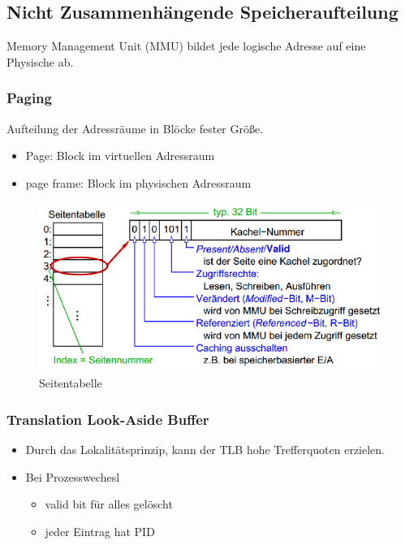 \subsection{Nicht Zusammenhängende Speicheraufteilung}
Memory Management Unit (MMU) bildet jede logische Adresse auf eine Physische ab.

\subsubsection{Paging}
Aufteilung der Adressräume in Blöcke fester Größe.
\begin{itemize}
    \item Page: Block im virtuellen Adressraum
    \item page frame: Block im physischen Adressraum
\end{itemize}

\begin{figure}[ht!]
    \includegraphics[scale=.5]{pics/pagetable}
    \caption{Seitentabelle}
\end{figure}

\pagebreak


\subsubsection{Translation Look-Aside Buffer}
\begin{itemize}
    \item Durch das Lokalitätsprinzip, kann der TLB hohe Trefferquoten erzielen.
    \item Bei Prozesswechesl
    \begin{itemize}
        \item valid bit für alles gelöscht
        \item jeder Eintrag hat PID
    \end{itemize}
\end{itemize}

